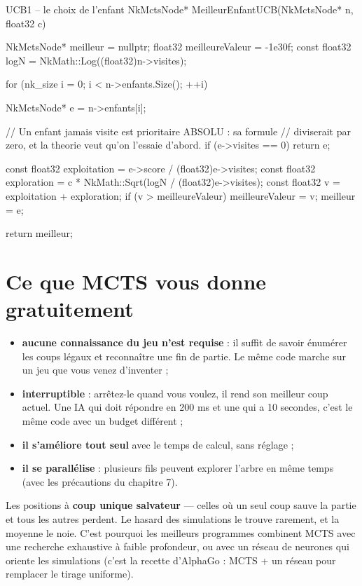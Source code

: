 \begin{nkcode}{UCB1 -- le choix de l'enfant}
NkMctsNode* MeilleurEnfantUCB(NkMctsNode* n, float32 c) {
    NkMctsNode* meilleur = nullptr;
    float32 meilleureValeur = -1e30f;
    const float32 logN = NkMath::Log((float32)n->visites);

    for (nk_size i = 0; i < n->enfants.Size(); ++i) {
        NkMctsNode* e = n->enfants[i];

        // Un enfant jamais visite est prioritaire ABSOLU : sa formule
        // diviserait par zero, et la theorie veut qu'on l'essaie d'abord.
        if (e->visites == 0)
            return e;

        const float32 exploitation = e->score / (float32)e->visites;
        const float32 exploration  = c * NkMath::Sqrt(logN / (float32)e->visites);
        const float32 v = exploitation + exploration;
        if (v > meilleureValeur) {
            meilleureValeur = v;
            meilleur = e;
        }
    }
    return meilleur;
}
\end{nkcode}

\section{Ce que MCTS vous donne gratuitement}

\begin{itemize}
  \item \textbf{aucune connaissance du jeu n'est requise} : il suffit de savoir
        énumérer les coups légaux et reconnaître une fin de partie. Le même
        code marche sur un jeu que vous venez d'inventer ;
  \item \textbf{interruptible} : arrêtez-le quand vous voulez, il rend son
        meilleur coup actuel. Une IA qui doit répondre en 200 ms et une qui a
        10 secondes, c'est le même code avec un budget différent ;
  \item \textbf{il s'améliore tout seul} avec le temps de calcul, sans réglage ;
  \item \textbf{il se parallélise} : plusieurs fils peuvent explorer l'arbre en
        même temps (avec les précautions du chapitre 7).
\end{itemize}

\begin{nkpiege}
Les positions à \textbf{coup unique salvateur} — celles où un seul coup sauve
la partie et tous les autres perdent. Le hasard des simulations le trouve
rarement, et la moyenne le noie. C'est pourquoi les meilleurs programmes
combinent MCTS avec une recherche exhaustive à faible profondeur, ou avec un
réseau de neurones qui oriente les simulations (c'est la recette d'AlphaGo :
MCTS + un réseau pour remplacer le tirage uniforme).
\end{nkpiege}

